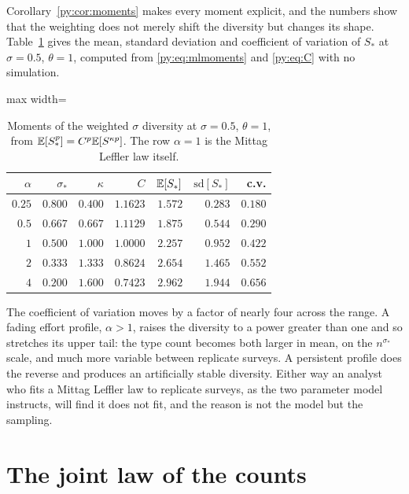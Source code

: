 Corollary~\ref{py:cor:moments} makes every moment explicit, and the numbers show that the weighting
does not merely shift the diversity but changes its shape.
Table~\ref{py:tab:moments} gives the mean, standard deviation and coefficient of variation of $S_*$ at
$\sigma = 0.5$, $\theta = 1$, computed from \eqref{py:eq:mlmoments} and \eqref{py:eq:C} with no
simulation.

\begin{table}[t]
\centering
\caption{Moments of the weighted $\sigma$ diversity at $\sigma = 0.5$, $\theta = 1$, from
$\mathbb{E}[S_*^{p}] = C^{p}\mathbb{E}[S^{\kappa p}]$. The row $\alpha = 1$ is the Mittag Leffler law itself.}
\label{py:tab:moments}
\begin{adjustbox}{max width=\textwidth}
\begin{tabular}{rrrrrrr}
\toprule
$\alpha$ & $\sigma_*$ & $\kappa$ & $C$ & $\mathbb{E}[S_*]$ & $\mathrm{sd}[S_*]$ & c.v.\\
\midrule
$0.25$ & $0.800$ & $0.400$ & $1.1623$ & $1.572$ & $0.283$ & $0.180$\\
$0.5$  & $0.667$ & $0.667$ & $1.1129$ & $1.875$ & $0.544$ & $0.290$\\
$1$    & $0.500$ & $1.000$ & $1.0000$ & $2.257$ & $0.952$ & $0.422$\\
$2$    & $0.333$ & $1.333$ & $0.8624$ & $2.654$ & $1.465$ & $0.552$\\
$4$    & $0.200$ & $1.600$ & $0.7423$ & $2.962$ & $1.944$ & $0.656$\\
\bottomrule
\end{tabular}
\end{adjustbox}
\end{table}

The coefficient of variation moves by a factor of nearly four across the range. A fading effort
profile, $\alpha > 1$, raises the diversity to a power greater than one and so stretches its upper
tail: the type count becomes both larger in mean, on the $n^{\sigma_*}$ scale, and much more
variable between replicate surveys. A persistent profile does the reverse and produces an
artificially stable diversity. Either way an analyst who fits a Mittag Leffler law to replicate
surveys, as the two parameter model instructs, will find it does not fit, and the reason is not the
model but the sampling.

\section{The joint law of the counts}
\label{py:sec:joint}

